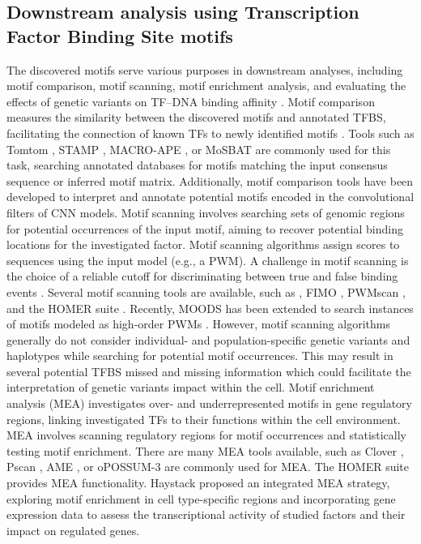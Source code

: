 \documentclass[a4paper, titlepage, openright]{book}
\begin{document}
\subsection{Downstream analysis using Transcription Factor Binding Site motifs}
The discovered motifs serve various purposes in downstream analyses, including motif comparison, motif scanning, motif enrichment analysis, and evaluating the effects of genetic variants on TF–DNA binding affinity \citep{tognon2023survey}. Motif comparison measures the similarity between the discovered motifs and annotated TFBS, facilitating the connection of known TFs to newly identified motifs \citep{gupta2007quantifying}. Tools such as Tomtom \citep{gupta2007quantifying}, STAMP \citep{mahony2007stamp}, MACRO-APE \citep{vorontsov2013jaccard}, or MoSBAT \citep{lambert2016motif} are commonly used for this task, searching annotated databases for motifs matching the input consensus sequence or inferred motif matrix. Additionally, motif comparison tools have been developed to interpret and annotate potential motifs encoded in the convolutional filters of CNN models. Motif scanning involves searching sets of genomic regions for potential occurrences of the input motif, aiming to recover potential binding locations for the investigated factor. Motif scanning algorithms assign scores to sequences using the input model (e.g., a PWM). A challenge in motif scanning is the choice of a reliable cutoff for discriminating between true and false binding events \citep{boeva2016analysis}. Several motif scanning tools are available, such as \citep{korhonen2009moods}, FIMO \citep{grant2011fimo}, PWMscan \citep{ambrosini2018pwmscan}, and the HOMER suite \citep{heinz2010simple}. Recently, MOODS has been extended to search instances of motifs modeled as high-order PWMs \citep{korhonen2017fast}. However, motif scanning algorithms generally do not consider individual- and population-specific genetic variants and haplotypes while searching for potential motif occurrences. This may result in several potential TFBS missed and missing information which could facilitate the interpretation of genetic variants impact within the cell. Motif enrichment analysis (MEA) investigates over- and underrepresented motifs in gene regulatory regions, linking investigated TFs to their functions within the cell environment. MEA involves scanning regulatory regions for motif occurrences and statistically testing motif enrichment. There are many MEA tools available, such as Clover \citep{frith2004detection}, Pscan \citep{zambelli2009pscan}, AME \citep{mcleay2010motif}, or oPOSSUM-3 \citep{kwon2012opossum} are commonly used for MEA. The HOMER suite provides MEA functionality. Haystack \citep{pinello2018haystack} proposed an integrated MEA strategy, exploring motif enrichment in cell type-specific regions and incorporating gene expression data to assess the transcriptional activity of studied factors and their impact on regulated genes.
\end{document}
